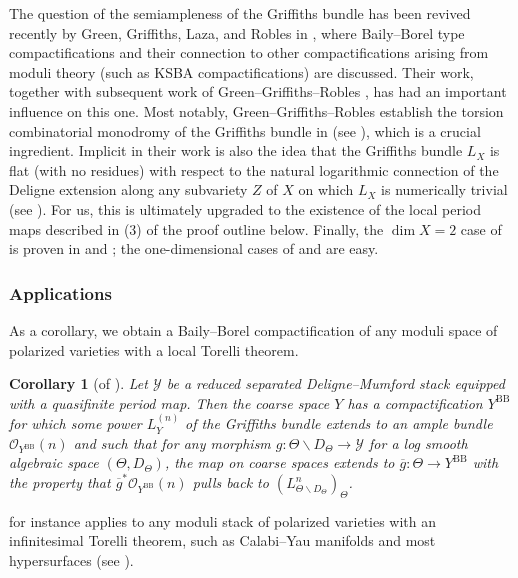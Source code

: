 \documentclass{amsart}
\newcommand{\bs}{\backslash}
\newcommand{\ol}{\overline}
\newtheorem{cor}[theorem]{Corollary}
\theoremstyle{definition}
\theoremstyle{remark}
\def\cO{\mathcal{O}}
\def\cY{\mathcal{Y}}
\def\BB{\mathrm{BB}}
\renewcommand{\bar}[1]{\ol{#1}}
\numberwithin{equation}{section}
\def\testsp{\Theta}
\begin{document}
The question of the semiampleness of the Griffiths bundle has been revived recently by Green, Griffiths, Laza, and Robles in \cite{GGLR17}, where Baily--Borel type compactifications and their connection to other compactifications arising from moduli theory (such as KSBA compactifications) are discussed.  Their work, together with subsequent work of Green--Griffiths--Robles \cite{GGRtorsion}, has had an important influence on this one.  Most notably, Green--Griffiths--Robles establish the torsion combinatorial monodromy of the Griffiths bundle in \cite[Thm 5.21]{GGRtorsion} (see ), which is a crucial ingredient.  Implicit in their work is also the idea that the Griffiths bundle $L_X$ is flat (with no residues) with respect to the natural logarithmic connection of the Deligne extension along any subvariety $Z$ of $X$ on which $L_X$ is numerically trivial (see ).  For us, this is ultimately upgraded to the existence of the local period maps described in (3) of the proof outline below.  Finally, the $\dim X=2$ case of  is proven in \cite{GGLR17} and \cite{GGRtorsion}; the one-dimensional cases of  and  are easy.  

\subsubsection{Applications}

As a corollary, we obtain a Baily--Borel compactification of any moduli space of polarized varieties with a local Torelli theorem.


\begin{cor}[of ]\label{cor:intro griffiths moduli}  Let $\cY$ be a reduced separated Deligne--Mumford stack equipped with a quasifinite period map.  Then the coarse space $Y$ has a compactification $Y^\BB$ for which some power $L_Y^{(n)}$ of the Griffiths bundle extends to an ample bundle $\cO_{Y^\BB}(n)$
and such that for any morphism $g:\testsp\bs D_\testsp\to \cY$
for a log smooth algebraic space $(\testsp,D_\testsp)$, the map on coarse spaces extends to $\bar g:\testsp\to Y^\BB$ with the property that $\bar g^*\cO_{Y^\BB}(n)$ pulls back to $(L^n_{\testsp\bs D_\testsp})_\testsp $.
\end{cor}
 for instance applies to any moduli stack of polarized varieties with an infinitesimal Torelli theorem, such as Calabi--Yau manifolds and most hypersurfaces (see \cite{BBT23}).  
\end{document}
